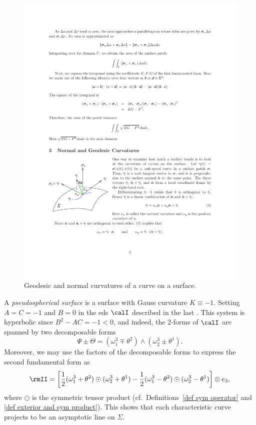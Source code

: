 \begin{figure}[tp]
    \centering
    \includegraphics[scale=1]{figures/geodesic.pdf}
    \caption{Geodesic and normal curvatures of a curve on a surface.}
    \label{fig:geodesic curvature}
\end{figure}

A \emph{pseudospherical surface} is a surface with Gauss curvature $K\equiv -1$. Setting $A=C=-1$ and $B=0$ in the \gls{eds} $\calI$ described in the last \subsect. This system is hyperbolic since $B^2-AC=-1<0$, and indeed, the $2$-forms of $\calI$ are spanned by two decomposable forms 
\[\Psi\pm \Theta=(\omega_1^3\mp \theta^2)\wedge(\omega_2^3\pm \theta^1).\]
Moreover, we may use the factors of the decomposable forms to express the second fundamental form as 
\[\rmII =\left[\frac12(\omega_1^3+\theta^2)\odot (\omega_2^3+\theta^1)-\frac12(\omega_1^3-\theta^2)\odot(\omega_2^3-\theta^1)\right]\otimes e_3,\]
where $\odot$ is the symmetric tensor product (cf.\ Definitions~\ref{def sym operator} and \ref{def exterior and sym product}). 
This shows that each characteristic curve projects to be an asymptotic line on $\Sigma$.

